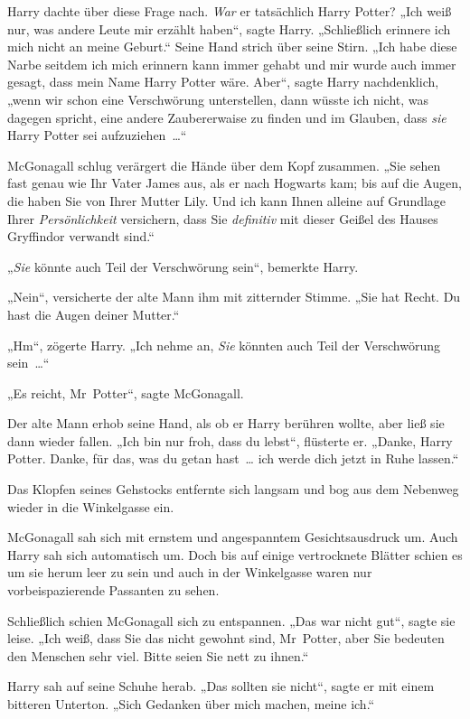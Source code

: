 Harry dachte über diese Frage nach. \emph{War} er tatsächlich Harry Potter? „Ich weiß nur, was andere Leute mir erzählt haben“, sagte Harry. „Schließlich erinnere ich mich nicht an meine Geburt.“ Seine Hand strich über seine Stirn. „Ich habe diese Narbe seitdem ich mich erinnern kann immer gehabt und mir wurde auch immer gesagt, dass mein Name Harry Potter wäre. Aber“, sagte Harry nachdenklich, „wenn wir schon eine Verschwörung unterstellen, dann wüsste ich nicht, was dagegen spricht, eine andere Zaubererwaise zu finden und im Glauben, dass \emph{sie} Harry Potter sei aufzuziehen …“

McGonagall schlug verärgert die Hände über dem Kopf zusammen. „Sie sehen fast genau wie Ihr Vater James aus, als er nach Hogwarts kam; bis auf die Augen, die haben Sie von Ihrer Mutter Lily. Und ich kann Ihnen alleine auf Grundlage Ihrer \emph{Persönlichkeit} versichern, dass Sie \emph{definitiv} mit dieser Geißel des Hauses Gryffindor verwandt sind.“

„\emph{Sie} könnte auch Teil der Verschwörung sein“, bemerkte Harry.

„Nein“, versicherte der alte Mann ihm mit zitternder Stimme. „Sie hat Recht. Du hast die Augen deiner Mutter.“

„Hm“, zögerte Harry. „Ich nehme an, \emph{Sie} könnten auch Teil der Verschwörung sein …“

„Es reicht, Mr~Potter“, sagte McGonagall.

Der alte Mann erhob seine Hand, als ob er Harry berühren wollte, aber ließ sie dann wieder fallen. „Ich bin nur froh, dass du lebst“, flüsterte er. „Danke, Harry Potter. Danke, für das, was du getan hast … ich werde dich jetzt in Ruhe lassen.“

Das Klopfen seines Gehstocks entfernte sich langsam und bog aus dem Nebenweg wieder in die Winkelgasse ein.

McGonagall sah sich mit ernstem und angespanntem Gesichtsausdruck um. Auch Harry sah sich automatisch um. Doch bis auf einige vertrocknete Blätter schien es um sie herum leer zu sein und auch in der Winkelgasse waren nur vorbeispazierende Passanten zu sehen.

Schließlich schien McGonagall sich zu entspannen. „Das war nicht gut“, sagte sie leise. „Ich weiß, dass Sie das nicht gewohnt sind, Mr~Potter, aber Sie bedeuten den Menschen sehr viel. Bitte seien Sie nett zu ihnen.“

Harry sah auf seine Schuhe herab. „Das sollten sie nicht“, sagte er mit einem bitteren Unterton. „Sich Gedanken über mich machen, meine ich.“

